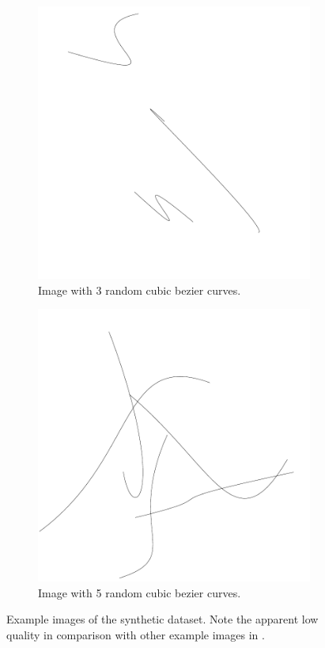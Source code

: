 \begin{figure}
\centering
    \begin{subfigure}{.45\textwidth}
        \includegraphics[width=\textwidth]{graphics/synth-3.pdf}
        \caption{Image with 3 random cubic bezier curves.}
    \end{subfigure}
    \begin{subfigure}{.45\textwidth}
        \includegraphics[width=\textwidth]{graphics/synth-5.pdf}
        \caption{Image with 5 random cubic bezier curves.}
    \end{subfigure}
    \caption{Example images of the synthetic dataset. Note the apparent low quality in comparison with other example images in .}
    \label{fig:synthetic-example}
\end{figure}

